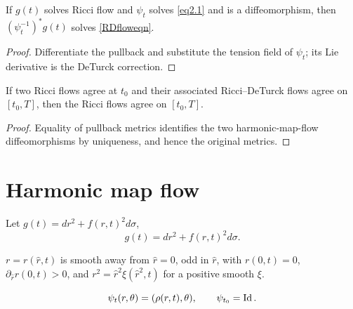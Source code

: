 \begin{lemma}
\label{lem:harmonic-map-flow-ricci-deturck}
\label{12.7}

If $g(t)$ solves Ricci flow and $\psi_t$ solves \eqref{eq2.1} and is a
diffeomorphism, then $(\psi_t^{-1})^*g(t)$ solves \eqref{RDfloweqn}.
\end{lemma}
\begin{proof}
\sketch Differentiate the pullback and substitute the tension field of
$\psi_t$; its Lie derivative is the DeTurck correction.
\end{proof}

\begin{corollary}
\label{cor:ricci-deturck-uniqueness-implies-ricci-uniqueness}
\label{dtuniqtouniq}

If two Ricci flows agree at $t_0$ and their associated Ricci--DeTurck
flows agree on $[t_0,T]$, then the Ricci flows agree on $[t_0,T]$.
\end{corollary}
\begin{proof}
\sketch Equality of pullback metrics identifies the two harmonic-map-flow
diffeomorphisms by uniqueness, and hence the original metrics.
\end{proof}

\section{Harmonic map flow}
Let $g(t)=dr^2+f(r,t)^2d\sigma$,
\begin{equation}\label{eq2.4}g(t)=dr^2+f(r,t)^2d\sigma.\end{equation}

\begin{claim}
\label{claim:radial-coordinate-properties}
\label{cl12.20}

$r=r(\hat r,t)$ is smooth away from $\hat r=0$, odd in $\hat r$, with
$r(0,t)=0$, $\partial_{\hat r}r(0,t)>0$, and
$r^2=\hat r^2\xi(\hat r^2,t)$ for a positive smooth $\xi$.
\end{claim}

\begin{equation}\label{ansatz}
\psi_t(r,\theta)=(\rho(r,t),\theta),\qquad\psi_{t_0}=\operatorname{Id}.
\end{equation}

